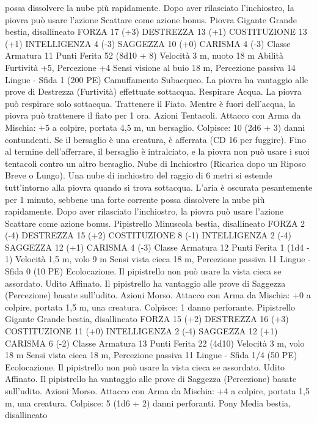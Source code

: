 \begin{multicols}{2}
possa dissolvere la nube più rapidamente. Dopo aver rilasciato
l’inchiostro, la piovra può usare l’azione Scattare come azione
bonus.
Piovra Gigante
Grande bestia, disallineato
FORZA 17 (+3)
DESTREZZA 13 (+1)
COSTITUZIONE 13 (+1)
INTELLIGENZA 4 (-3)
SAGGEZZA 10 (+0)
CARISMA 4 (-3)
Classe Armatura 11
Punti Ferita 52 (8d10 + 8)
Velocità 3 m, nuoto 18 m
Abilità Furtività +5, Percezione +4
Sensi visione al buio 18 m, Percezione passiva 14
Lingue -
Sfida 1 (200 PE)
Camuffamento Subacqueo. La piovra ha vantaggio alle prove di
Destrezza (Furtività) effettuate sottacqua.
Respirare Acqua. La piovra può respirare solo sottacqua.
Trattenere il Fiato. Mentre è fuori dell’acqua, la piovra può
trattenere il fiato per 1 ora.
Azioni
Tentacoli. Attacco con Arma da Mischia: +5 a colpire, portata
4,5 m, un bersaglio.
Colpisce: 10 (2d6 + 3) danni contundenti. Se il bersaglio è una
creatura, è afferrata (CD 16 per fuggire). Fino al termine
dell’afferrare, il bersaglio è intralciato, e la piovra non può usare
i suoi tentacoli contro un altro bersaglio.
Nube di Inchiostro (Ricarica dopo un Riposo Breve o Lungo).
Una nube di inchiostro del raggio di 6 metri si estende
tutt’intorno alla piovra quando si trova sottacqua. L’aria è
oscurata pesantemente per 1 minuto, sebbene una forte corrente
possa dissolvere la nube più rapidamente. Dopo aver rilasciato
l’inchiostro, la piovra può usare l’azione Scattare come azione
bonus.
Pipistrello
Minuscola bestia, disallineato
FORZA 2 (-4)
DESTREZZA 15 (+2)
COSTITUZIONE 8 (-1)
INTELLIGENZA 2 (-4)
SAGGEZZA 12 (+1)
CARISMA 4 (-3)
Classe Armatura 12
Punti Ferita 1 (1d4 - 1)
Velocità 1,5 m, volo 9 m
Sensi vista cieca 18 m, Percezione passiva 11
Lingue -
Sfida 0 (10 PE)
Ecolocazione. Il pipistrello non può usare la vista cieca se
assordato.
Udito Affinato. Il pipistrello ha vantaggio alle prove di Saggezza
(Percezione) basate sull’udito.
Azioni
Morso. Attacco con Arma da Mischia: +0 a colpire, portata 1,5
m, una creatura.
Colpisce: 1 danno perforante.
Pipistrello Gigante
Grande bestia, disallineato
FORZA 15 (+2)
DESTREZZA 16 (+3)
COSTITUZIONE 11 (+0)
INTELLIGENZA 2 (-4)
SAGGEZZA 12 (+1)
CARISMA 6 (-2)
Classe Armatura 13
Punti Ferita 22 (4d10)
Velocità 3 m, volo 18 m
Sensi vista cieca 18 m, Percezione passiva 11
Lingue -
Sfida 1/4 (50 PE)
Ecolocazione. Il pipistrello non può usare la vista cieca se
assordato.
Udito Affinato. Il pipistrello ha vantaggio alle prove di Saggezza
(Percezione) basate sull’udito.
Azioni
Morso. Attacco con Arma da Mischia: +4 a colpire, portata 1,5
m, una creatura.
Colpisce: 5 (1d6 + 2) danni perforanti.
Pony
Media bestia, disallineato

\end{multicols}
